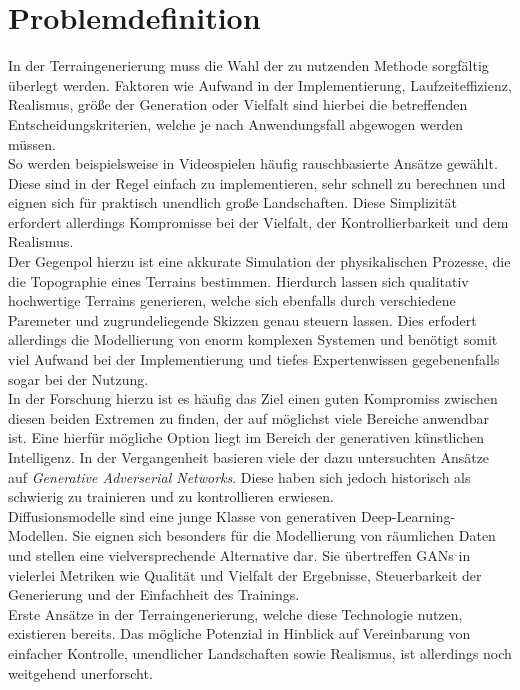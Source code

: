 \section{Problemdefinition}

In der Terraingenerierung muss die Wahl der zu nutzenden Methode sorgfältig überlegt werden. Faktoren wie Aufwand in der Implementierung, Laufzeiteffizienz, Realismus, größe der Generation oder Vielfalt sind hierbei die betreffenden Entscheidungskriterien, welche je nach Anwendungsfall abgewogen werden müssen. \\
So werden beispielsweise in Videospielen häufig rauschbasierte Ansätze gewählt. Diese sind in der Regel einfach zu implementieren, sehr schnell zu berechnen und eignen sich für praktisch unendlich große Landschaften. Diese Simplizität erfordert allerdings Kompromisse bei der Vielfalt, der Kontrollierbarkeit und dem Realismus. \\
Der Gegenpol hierzu ist eine akkurate Simulation der physikalischen Prozesse, die die Topographie eines Terrains bestimmen. Hierdurch lassen sich qualitativ hochwertige Terrains generieren, welche sich ebenfalls durch verschiedene Paremeter und zugrundeliegende Skizzen genau steuern lassen. Dies erfodert allerdings die Modellierung von enorm komplexen Systemen und benötigt somit viel Aufwand bei der Implementierung und tiefes Expertenwissen gegebenenfalls sogar bei der Nutzung. \\
In der Forschung hierzu ist es häufig das Ziel einen guten Kompromiss zwischen diesen beiden Extremen zu finden, der auf möglichst viele Bereiche anwendbar ist. Eine hierfür mögliche Option liegt im Bereich der generativen künstlichen Intelligenz. In der Vergangenheit basieren viele der dazu untersuchten Ansätze auf \textit{Generative Adverserial Networks}. Diese haben sich jedoch historisch als schwierig zu trainieren und zu kontrollieren erwiesen. \\
Diffusionsmodelle sind eine junge Klasse von generativen Deep-Learning-Modellen. Sie eignen sich besonders für die Modellierung von räumlichen Daten und stellen eine vielversprechende Alternative dar. Sie übertreffen GANs in vielerlei Metriken wie Qualität und Vielfalt der Ergebnisse, Steuerbarkeit der Generierung und der Einfachheit des Trainings. \\
Erste Ansätze in der Terraingenerierung, welche diese Technologie nutzen, existieren bereits. Das mögliche Potenzial in Hinblick auf Vereinbarung von einfacher Kontrolle, unendlicher Landschaften sowie Realismus, ist allerdings noch weitgehend unerforscht.

